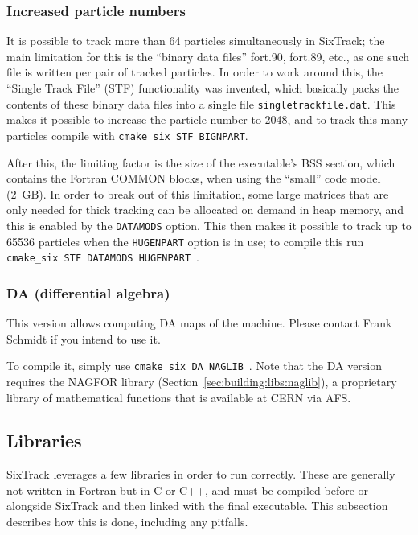\documentclass[english]{article}
\begin{document}
\subsubsection{Increased particle numbers}
It is possible to track more than 64 particles simultaneously in SixTrack; the main limitation for this is the ``binary data files'' fort.90, fort.89, etc., as one such file is written per pair of tracked particles.
In order to work around this, the ``Single Track File'' (STF) functionality was invented, which basically packs the contents of these binary data files into a single file \texttt{singletrackfile.dat}.
This makes it possible to increase the particle number to 2048, and to track this many particles compile with \texttt{cmake\_six STF BIGNPART}.

After this, the limiting factor is the size of the executable's BSS section, which contains the Fortran COMMON blocks, when using the ``small'' code model (2~GB).
In order to break out of this limitation, some large matrices that are only needed for thick tracking can be allocated on demand in heap memory, and this is enabled by the \texttt{DATAMODS} option.
This then makes it possible to track up to 65536 particles when the \texttt{HUGENPART} option is in use; to compile this run \texttt{cmake\_six STF DATAMODS HUGENPART}~.


\subsubsection{DA (differential algebra)}
This version allows computing DA maps of the machine.
Please contact Frank Schmidt if you intend to use it.

To compile it, simply use \texttt{cmake\_six DA NAGLIB}~.
Note that the DA version requires the NAGFOR library (Section~\ref{sec:building:libs:naglib}), a proprietary library of mathematical functions that is available at CERN via AFS.

\subsection{Libraries}
SixTrack leverages a few libraries in order to run correctly.
These are generally not written in Fortran but in C or C++, and must be compiled before or alongside SixTrack and then linked with the final executable.
This subsection describes how this is done, including any pitfalls.
\end{document}
